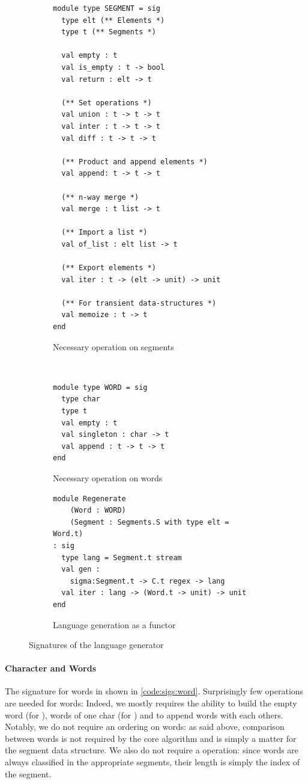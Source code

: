 \begin{figure}[b]
  \centering
  \begin{subfigure}{0.44\linewidth}
\begin{lstlisting}[basicstyle=\scriptsize\ttfamily]
module type SEGMENT = sig
  type elt (** Elements *)
  type t (** Segments *)

  val empty : t
  val is_empty : t -> bool
  val return : elt -> t

  (** Set operations *)
  val union : t -> t -> t
  val inter : t -> t -> t
  val diff : t -> t -> t

  (** Product and append elements *)
  val append: t -> t -> t

  (** n-way merge *)
  val merge : t list -> t

  (** Import a list *)
  val of_list : elt list -> t

  (** Export elements *)
  val iter : t -> (elt -> unit) -> unit

  (** For transient data-structures *)
  val memoize : t -> t
end
\end{lstlisting}
    \caption{Necessary operation on segments}
    \label{code:sigs:segment}
  \end{subfigure}~
  \begin{subfigure}{0.57\linewidth}
\begin{lstlisting}[basicstyle=\scriptsize\ttfamily]
module type WORD = sig
  type char
  type t
  val empty : t
  val singleton : char -> t
  val append : t -> t -> t
end
\end{lstlisting}
    \caption{Necessary operation on words}
    \label{code:sigs:word}
\begin{lstlisting}[basicstyle=\scriptsize\ttfamily]
module Regenerate
    (Word : WORD)
    (Segment : Segments.S with type elt = Word.t)
: sig
  type lang = Segment.t stream
  val gen : 
    sigma:Segment.t -> C.t regex -> lang
  val iter : lang -> (Word.t -> unit) -> unit
end
\end{lstlisting}
    \caption{Language generation as a functor}
    \label{code:sigs:regen}
  \end{subfigure}
  \caption{Signatures of the language generator}
  \label{code:sigs}
\end{figure}

\paragraph{Character and Words}

The signature for words in shown in \autoref{code:sigs:word}.
Surprisingly few operations are needed for words: Indeed, we mostly requires the ability to build the empty word (for ),
words of one char (for ) and to append words
with each others.
Notably, we do not require an ordering on words: as said above, comparison between words is not required by the core algorithm and is simply a matter for the segment
data structure.
We also do not require a  operation: since words are always
classified in the appropriate segments, their length is simply the index
of the segment.

